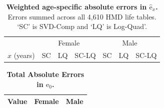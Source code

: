 \documentclass[11pt]{article}
\newcommand{\ez}{{\mbox{e}}{_0}}
\newcommand{\exhat}{{\widehat{\mbox{e}}}{_x}}
\begin{document}
\begin{appendices}
\begin{table}[htp]
\captionsetup{format=plain,font=normalsize,margin=2cm,justification=justified}
\caption{\textbf{Weighted age-specific absolute errors in $\exhat$.} Errors summed across all 4,610 HMD life tables. `SC' is SVD-Comp and `LQ' is Log-Quad'.}
\begin{center}
\begin{tabular}{crrrrrr}
  \toprule
  & \multicolumn{3}{c}{Female} & \multicolumn{3}{c}{Male} \\
  \cmidrule(lr){2-4} \cmidrule(lr){5-7}
  $x$ (years) & \multicolumn{1}{c}{SC} & \multicolumn{1}{c}{LQ} & \multicolumn{1}{c}{SC-LQ} & \multicolumn{1}{c}{SC} & \multicolumn{1}{c}{LQ} & \multicolumn{1}{c}{SC-LQ} \\
  \midrule
  
  \midrule
  
   \bottomrule
\end{tabular}
\end{center}
\label{tab:eErrs}
\end{table}%

\begin{table}[htp]
\captionsetup{format=plain,font=normalsize,margin=4cm,justification=justified}
\caption{\textbf{Total Absolute Errors in $\ez$.}}
\begin{center}
\begin{tabular}{lrr}
  \toprule
  Value & Female & Male \\
  \midrule
  
  
  
  \bottomrule
\end{tabular}
\end{center}
\label{tab:e0Errs}
\end{table}%

\end{appendices}
\end{document}
